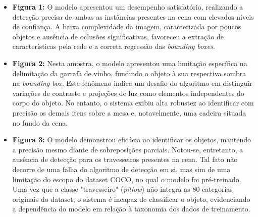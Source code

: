 \documentclass[conference]{IEEEtran}
\begin{document}
 \begin{itemize}
     \item \textbf{Figura 1:} O modelo apresentou um desempenho satisfatório, realizando a detecção precisa de ambas as instâncias presentes na cena com elevados níveis de confiança. A baixa complexidade da imagem, caracterizada por poucos objetos e ausência de oclusões significativas, favoreceu a extração de características pela rede e a correta regressão das \textit{bounding boxes}. 
 \end{itemize}


 \begin{itemize}
     \item \textbf{Figura 2:} Nesta amostra, o modelo apresentou uma limitação específica na delimitação da garrafa de vinho, fundindo o objeto à sua respectiva sombra na \textit{bounding box}. Este fenômeno indica um desafio do algoritmo em distinguir variações de contraste e projeções de luz como elementos independentes do corpo do objeto. No entanto, o sistema exibiu alta robustez ao identificar com precisão os demais itens sobre a mesa e, notavelmente, uma cadeira situada no fundo da cena.
 \end{itemize}


  \begin{itemize}
     \item \textbf{Figura 3:} O modelo demonstrou eficácia ao identificar os objetos, mantendo a precisão mesmo diante de sobreposições parciais. Notou-se, entretanto, a ausência de detecção para os travesseiros presentes na cena. Tal fato não decorre de uma falha do algoritmo de detecção em si, mas sim de uma limitação do escopo do dataset COCO, no qual o modelo foi pré-treinado. Uma vez que a classe "travesseiro" (\textit{pillow}) não integra as 80 categorias originais do dataset, o sistema é incapaz de classificar o objeto, evidenciando a dependência do modelo em relação à taxonomia dos dados de treinamento. 
 \end{itemize}
\end{document}
